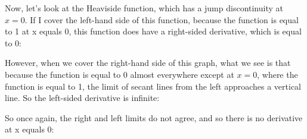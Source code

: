 \documentclass[pdftex, brazil, 12pt, twoside]{article}
\begin{document}
Now, let's look at the Heaviside
function, which has a jump discontinuity at $x = 0$.
If I cover the left-hand side of this function,
because the function is equal to 1 at x equals 0,
this function does have a right-sided derivative,
which is equal to 0:

\begin{figure}[H]
  \begin{center}
  \end{center}
\end{figure}

However, when we cover the right-hand side of this graph,
what we see is that because the function is equal to 0 almost
everywhere except at $x = 0$, where the function is
equal to 1, the limit of secant lines from the left
approaches a vertical line.
So the left-sided derivative is infinite:

\begin{figure}[H]
  \begin{center}
  \end{center}
\end{figure}

So once again, the right and left limits do not agree,
and so there is no derivative at x equals 0:
\end{document}
